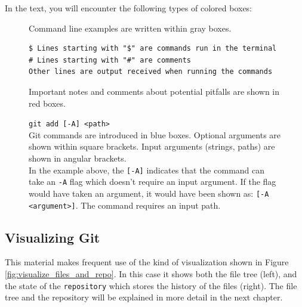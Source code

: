 \documentclass[../main/git_course_main.tex]{subfiles}
\begin{document}
In the text, you will encounter the following types of colored boxes:

\begin{figure}[h!]
\begin{codebox}
\vspace{10pt}
Command line examples are written within gray boxes. 
\begin{lstlisting}
$ Lines starting with "$" are commands run in the terminal
# Lines starting with "#" are comments
Other lines are output received when running the commands
\end{lstlisting}
\end{codebox}
\end{figure}

\begin{figure}[h!]
\begin{tcolorbox}[colback=red!5,colframe=red!40!black,title=Note]
Important notes and comments about potential pitfalls are shown in red boxes.
\end{tcolorbox}
\end{figure}

\begin{figure}[h!]
\begin{tcolorbox}[colback=blue!5,colframe=blue!40!black]
\verb$git add [-A] <path>$ \\

Git commands are introduced in blue boxes. Optional arguments
are shown within square brackets. Input arguments (strings, paths) are shown
in angular brackets. \\

In the example above, the \verb$[-A]$ indicates
that the command can take an \verb$-A$ flag which doesn't require an input argument. If the flag would have taken an argument, it would have been shown as: \verb$[-A <argument>]$. The command requires an input path.
\end{tcolorbox}
\end{figure}

\subsection{Visualizing Git}

This material makes frequent use of the kind of visualization shown in Figure \ref{fig:visualize_files_and_repo}. In this case it shows both the file tree (left), and the state of the \verb$repository$ which stores the history of the files (right). The file tree and the repository will be explained in more detail in the next chapter.
\end{document}
